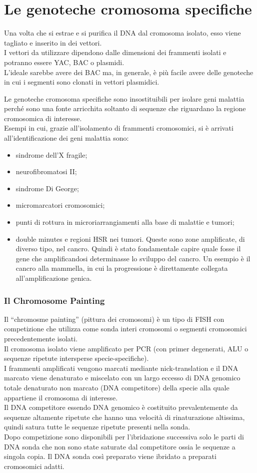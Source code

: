 \documentclass[11pt]{book}
\begin{document}
\section{Le genoteche cromosoma specifiche} 
Una volta che si estrae e si purifica il DNA dal cromosoma isolato, esso viene tagliato e inserito in dei vettori.\\
I vettori da utilizzare dipendono dalle dimensioni dei frammenti isolati e potranno essere YAC, BAC o plasmidi.\\
L’ideale sarebbe avere dei BAC ma, in generale, è più facile avere delle genoteche in cui i segmenti sono clonati in vettori plasmidici.

Le genoteche cromosoma specifiche sono insostituibili per isolare geni malattia perché sono una fonte arricchita soltanto di sequenze che riguardano la regione cromosomica di interesse.\\
Esempi in cui, grazie all’isolamento di frammenti cromosomici, si è arrivati all’identificazione dei geni malattia sono:
\begin{itemize}
\item sindrome dell’X fragile; 
\item neurofibromatosi II; 
\item sindrome Di George; 
\item micromarcatori cromosomici; 
\item punti di rottura in microriarrangiamenti alla base di malattie e tumori; 
\item double minutes e regioni HSR nei tumori. Queste sono zone amplificate, di diverso tipo, nel cancro. Quindi è stato fondamentale capire quale fosse il gene che amplificandosi determinasse lo sviluppo del cancro. Un esempio è il cancro alla mammella, in cui la progressione è direttamente collegata all’amplificazione genica.
\end{itemize}

\subsubsection{Il Chromosome Painting}
Il ``chromosme painting'' (pittura dei cromosomi) è un tipo di FISH con competizione che utilizza come sonda interi cromosomi o segmenti cromosomici precedentemente isolati.\\
Il cromosoma isolato viene amplificato per PCR (con primer degenerati, ALU o sequenze ripetute intersperse specie-specifiche).\\
I frammenti amplificati vengono marcati mediante nick-translation e il DNA marcato viene denaturato e miscelato con un largo eccesso di DNA genomico totale denaturato non marcato (DNA competitore) della specie alla quale appartiene il cromosoma di interesse.\\
Il DNA competitore essendo DNA genomico è costituito prevalentemente da sequenze altamente ripetute che hanno una velocità di rinaturazione altissima, quindi satura tutte le sequenze ripetute presenti nella sonda.\\
Dopo competizione sono disponibili per l’ibridazione successiva solo le parti di DNA sonda che non sono state saturate dal competitore ossia le sequenze a singola copia.
Il DNA sonda così preparato viene ibridato a preparati cromosomici adatti.
\end{document}
